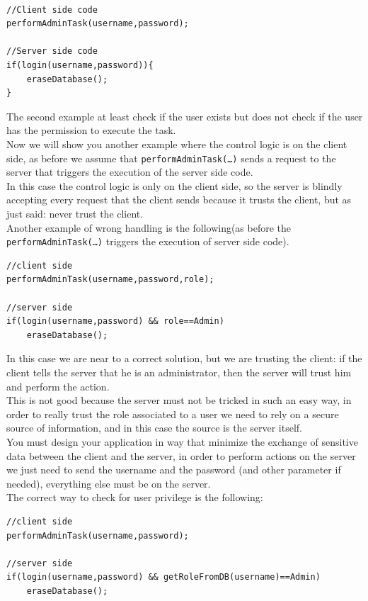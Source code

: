 \begin{lstlisting}

//Client side code
performAdminTask(username,password);

//Server side code
if(login(username,password)){
	eraseDatabase();
}
\end{lstlisting}

The second example at least check if the user exists but does not check if the user has the permission to execute the task.\\
Now we will show you another example where the control logic is on the client side, as before we assume that \texttt{performAdminTask(…)} sends a request to the server that triggers the execution of the server side code.\\

In this case the control logic is only on the client side, so the server is blindly accepting every request that the client sends because it trusts the client, but as just said: never trust the client.\\
Another example of wrong handling is the following(as before the \texttt{performAdminTask(…)} triggers the execution of server side code).\\

\begin{lstlisting}
//client side
performAdminTask(username,password,role);

//server side
if(login(username,password) && role==Admin)
	eraseDatabase();
\end{lstlisting}


In this case we are near to a correct solution, but we are trusting the client: if the client tells the server that he is an administrator, then the server will trust him and perform the action.\\
This is not good because the server must not be tricked in such an easy way, in order to really trust the role associated to a user we need to rely on a secure source of information, and in this case the source is the server itself.\\
You must design your application in way that minimize the exchange of sensitive data between the client and the server, in order to perform actions on the server we just need to send the username and the password (and other parameter if needed), everything else must be on the server.\\
The correct way to check for user privilege is the following:

\begin{lstlisting}
//client side
performAdminTask(username,password);

//server side
if(login(username,password) && getRoleFromDB(username)==Admin)
	eraseDatabase();
\end{lstlisting}

